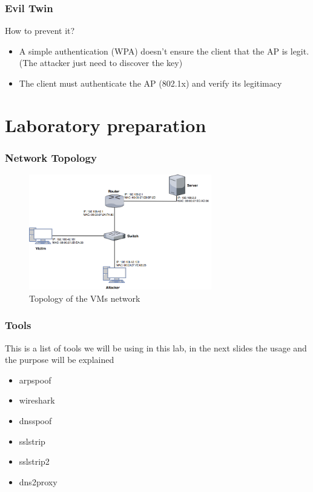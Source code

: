 \documentclass{beamer}
\begin{document}
\begin{frame}
  \frametitle{Evil Twin}
  \begin{block}{How to prevent it?}
  \pause
  \begin{itemize}
    \item A simple authentication (WPA) doesn't ensure the client that the AP is legit. (The attacker just need to discover the key)
    \item The client must authenticate the AP (802.1x) and verify its legitimacy
  \end{itemize}
\end{block}
\end{frame}

\section{Laboratory preparation}
\begin{frame}
\frametitle{Network Topology}
\begin{figure}
  \includegraphics[height=190px]{figures/net_topo}
  \caption*{Topology of the VMs network}
\end{figure}
\end{frame}


\begin{frame}
\frametitle{Tools}
This is a list of tools we will be using in this lab, in the next slides the usage and the purpose will be explained
\vfill
\begin{block}{}
  \begin{itemize}
    \item arpspoof
    \item wireshark
    \item dnsspoof
    \item sslstrip
    \item sslstrip2
    \item dns2proxy
  \end{itemize}
\end{block}

\end{frame}
\end{document}
